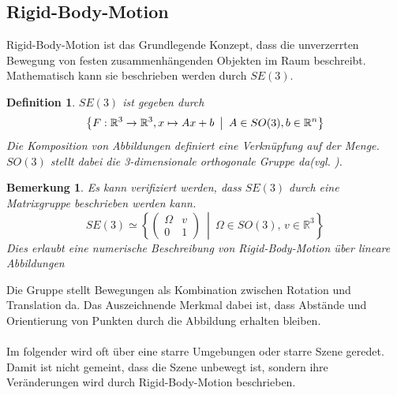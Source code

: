 \documentclass[12pt,DIV=15,BCOR=15mm,twoside,headsepline,abstract=true,listof=totoc,bibliography=totoc]{scrreprt}
\newtheorem{remark}{Bemerkung}[chapter]
\newtheorem{defi}{Definition}
\theoremstyle{remark}    %
\begin{document}
    \subsection{Rigid-Body-Motion}
    Rigid-Body-Motion ist das Grundlegende Konzept, dass die unverzerrten Bewegung von festen zusammenhängenden Objekten im Raum beschreibt. 
    Mathematisch kann sie beschrieben werden durch $SE(3)$. \cite{Murray1994}
    \begin{defi}
        $SE(3)$ ist gegeben durch 
        \begin{equation}
            \left\{F: \mathbb{R}^3 \to \mathbb{R}^3, x \mapsto Ax + b \hspace{0.5em} \middle| \hspace{0.5em} A \in SO(3), b \in \mathbb{R}^n\right\}
        \end{equation}
        Die Komposition von Abbildungen definiert eine Verknüpfung auf der Menge. $SO(3)$ stellt dabei die 3-dimensionale orthogonale Gruppe da(vgl. \cite{Murray1994}).
    \end{defi}
    \begin{remark} \label{bem:hom_coords}
    Es kann verifiziert werden, dass $SE(3)$ durch eine Matrixgruppe beschrieben werden kann. \[
        SE(3)  \simeq 
            \left\{
            \begin{pmatrix}
            \Omega & v \\[3pt]
            0 & 1
            \end{pmatrix}
            \ \middle|\ 
            \Omega \in SO(3),\, v \in \mathbb{R}^3
            \right\}
    \]Dies erlaubt eine numerische Beschreibung von Rigid-Body-Motion über lineare Abbildungen \cite{Murray1994}
    \end{remark} \noindent
    Die Gruppe stellt Bewegungen als Kombination zwischen Rotation und Translation da. Das Auszeichnende Merkmal dabei ist, dass Abstände und Orientierung von Punkten
    durch die Abbildung erhalten bleiben.\cite{Murray1994}\\\\
    Im folgender wird oft über eine starre Umgebungen oder starre Szene geredet. Damit ist nicht gemeint, dass die Szene unbewegt ist, sondern 
    ihre Veränderungen wird durch Rigid-Body-Motion beschrieben.
\end{document}
